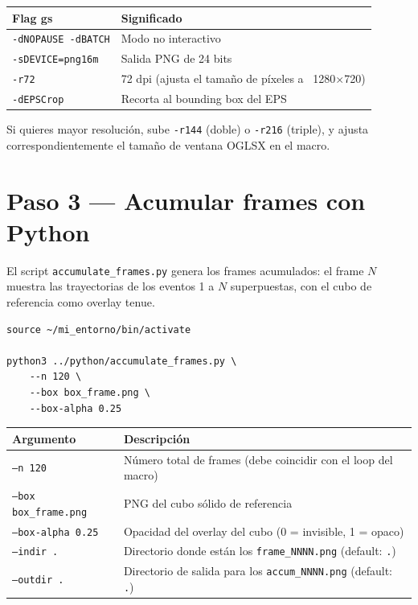\documentclass[11pt,a4paper]{article}
\begin{document}
\begin{center}
\begin{tabular}{ll}
  \toprule
  \textbf{Flag gs} & \textbf{Significado} \\
  \midrule
  \texttt{-dNOPAUSE -dBATCH} & Modo no interactivo \\
  \texttt{-sDEVICE=png16m}    & Salida PNG de 24 bits \\
  \texttt{-r72}               & 72 dpi (ajusta el tamaño de píxeles a ~1280$\times$720) \\
  \texttt{-dEPSCrop}          & Recorta al bounding box del EPS \\
  \bottomrule
\end{tabular}
\end{center}

Si quieres mayor resolución, sube \texttt{-r144} (doble) o \texttt{-r216} (triple),
y ajusta correspondientemente el tamaño de ventana OGLSX en el macro.

\section{Paso 3 — Acumular frames con Python}

El script \texttt{accumulate\_frames.py} genera los frames acumulados:
el frame $N$ muestra las trayectorias de los eventos 1 a $N$ superpuestas,
con el cubo de referencia como overlay tenue.

\begin{lstlisting}[style=console, caption={Acumulación — desde build/}]
source ~/mi_entorno/bin/activate

python3 ../python/accumulate_frames.py \
    --n 120 \
    --box box_frame.png \
    --box-alpha 0.25
\end{lstlisting}

\begin{center}
\begin{tabular}{lp{8.5cm}}
  \toprule
  \textbf{Argumento} & \textbf{Descripción} \\
  \midrule
  \texttt{--n 120}             & Número total de frames (debe coincidir con el loop del macro) \\
  \texttt{--box box\_frame.png} & PNG del cubo sólido de referencia \\
  \texttt{--box-alpha 0.25}    & Opacidad del overlay del cubo (0 = invisible, 1 = opaco) \\
  \texttt{--indir .}           & Directorio donde están los \texttt{frame\_NNNN.png} (default: \texttt{.}) \\
  \texttt{--outdir .}          & Directorio de salida para los \texttt{accum\_NNNN.png} (default: \texttt{.}) \\
  \bottomrule
\end{tabular}
\end{center}
\end{document}
